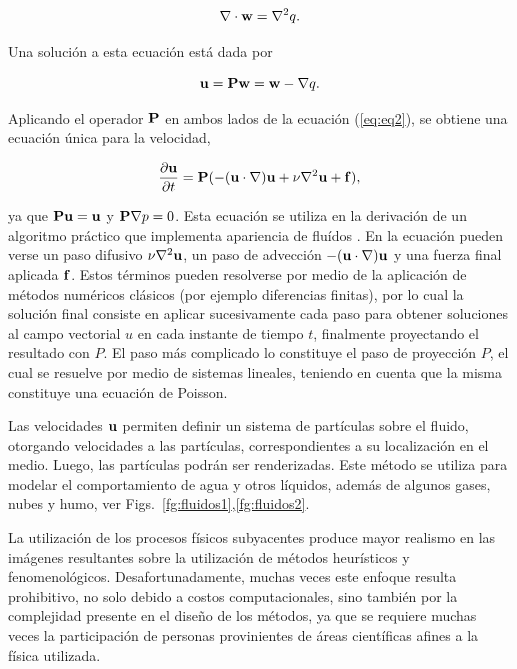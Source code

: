 \begin{equation}
\label{eq:eq4}
\nabla\cdot\bold{w} = \nabla^{2} q.
\end{equation}

Una solución a esta ecuación está dada por

\begin{equation}
\label{eq:eq5}
\bold{u} = \bold{P}\bold{w} = \bold{w} - \nabla q.
\end{equation}

Aplicando el operador $\bold{P}$ en ambos lados de la ecuación (\ref{eq:eq2}), se obtiene una ecuación única para la velocidad,

\begin{equation}
\frac{\partial \bold{u} }{\partial t} = \bold{P} (- (\bold{u} \cdot \nabla) \bold{u} + \nu \nabla^{2} \bold{u} + \bold{f}) \label{eq:eq6},
\end{equation}

\noindent ya que $\bold{P}\bold{u} = \bold{u}$ y $\bold{P}\nabla p = 0$.
Esta ecuación se utiliza en la derivación de un algoritmo práctico que implementa apariencia de fluídos \cite{Stam1999}.
En la ecuación pueden verse un paso difusivo $\nu \nabla^{2} \bold{u}$, un paso de advección $- (\bold{u} \cdot \nabla) \bold{u}$ y una fuerza final aplicada $\bold{f}$.
Estos términos pueden resolverse por medio de la aplicación de métodos numéricos clásicos (por ejemplo diferencias finitas), por lo cual la solución final consiste en aplicar sucesivamente cada paso para obtener soluciones al campo vectorial $u$ en cada instante de tiempo $t$, finalmente proyectando el resultado con $P$.
El paso más complicado lo constituye el paso de proyección $P$, el cual se resuelve por medio de sistemas lineales, teniendo en cuenta que la misma constituye una ecuación de Poisson.

Las velocidades $\bold{u}$ permiten definir un sistema de partículas sobre el fluido, otorgando velocidades a las partículas, correspondientes a su localización en el medio.
Luego, las partículas podrán ser renderizadas.
Este método se utiliza para modelar el comportamiento de agua y otros líquidos, además de algunos gases, nubes y humo, ver Figs.~\ref{fg:fluidos1},\ref{fg:fluidos2}.

La utilización de los procesos físicos subyacentes produce mayor realismo en las imágenes resultantes sobre la utilización de métodos heurísticos y fenomenológicos.
Desafortunadamente, muchas veces este enfoque resulta prohibitivo, no solo debido a costos computacionales, sino también por la complejidad presente en el diseño de los métodos, ya que se requiere muchas veces la participación de personas provinientes de áreas científicas afines a la física utilizada.


